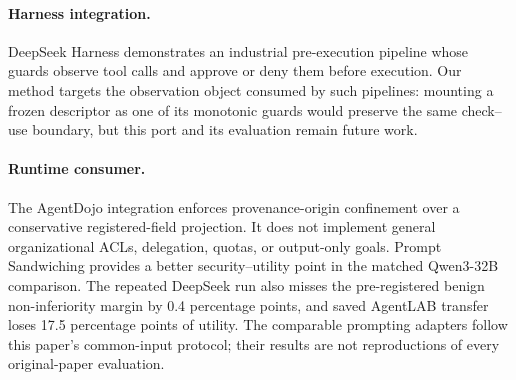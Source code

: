 \paragraph{Harness integration.}
DeepSeek Harness demonstrates an industrial pre-execution pipeline whose
guards observe tool calls and approve or deny them before execution. Our
method targets the observation object consumed by such pipelines: mounting a
frozen descriptor as one of its monotonic guards would preserve the same
check--use boundary, but this port and its evaluation remain future work.

\paragraph{Runtime consumer.}
The AgentDojo integration enforces provenance-origin confinement over a
conservative registered-field projection. It does not implement general
organizational ACLs, delegation, quotas, or output-only goals. Prompt
Sandwiching provides a better
security--utility point in the matched Qwen3-32B comparison. The repeated
DeepSeek run also misses the pre-registered benign non-inferiority margin by 0.4
percentage points, and saved AgentLAB transfer loses 17.5 percentage points of
utility. The comparable prompting adapters follow this paper's common-input
protocol; their results are not reproductions of every original-paper
evaluation.
